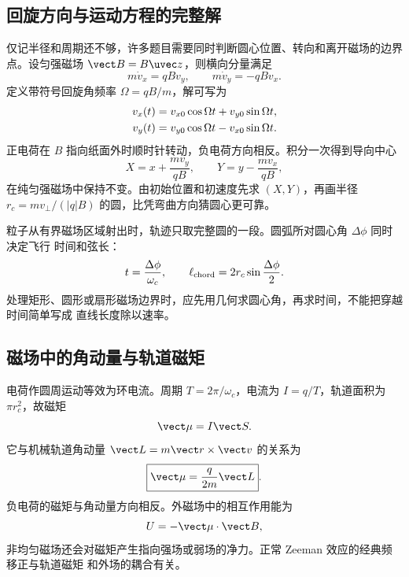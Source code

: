 \subsection*{回旋方向与运动方程的完整解}

仅记半径和周期还不够，许多题目需要同时判断圆心位置、转向和离开磁场的边界点。设匀强磁场
$\vect B=B\uvec z$，则横向分量满足
\begin{equation}
 m\dot v_x=qBv_y,
 \qquad
 m\dot v_y=-qBv_x.
\end{equation}
定义带符号回旋角频率 $\Omega=qB/m$，解可写为
\begin{align}
 v_x(t)&=v_{x0}\cos\Omega t+v_{y0}\sin\Omega t,\notag\\
 v_y(t)&=v_{y0}\cos\Omega t-v_{x0}\sin\Omega t.
\end{align}
正电荷在 $B$ 指向纸面外时顺时针转动，负电荷方向相反。积分一次得到导向中心
\begin{equation}
 X=x+\frac{mv_y}{qB},
 \qquad
 Y=y-\frac{mv_x}{qB},
\end{equation}
在纯匀强磁场中保持不变。由初始位置和初速度先求 $(X,Y)$，再画半径
$r_c=mv_\perp/(|q|B)$ 的圆，比凭弯曲方向猜圆心更可靠。

粒子从有界磁场区域射出时，轨迹只取完整圆的一段。圆弧所对圆心角 $\Delta\phi$ 同时决定飞行
时间和弦长：
\begin{equation}
 t=\frac{\Delta\phi}{\omega_c},
 \qquad
 \ell_{\rm chord}=2r_c\sin\frac{\Delta\phi}{2}.
\end{equation}
处理矩形、圆形或扇形磁场边界时，应先用几何求圆心角，再求时间，不能把穿越时间简单写成
直线长度除以速率。

\subsection*{磁场中的角动量与轨道磁矩}

电荷作圆周运动等效为环电流。周期 $T=2\pi/\omega_c$，电流为 $I=q/T$，轨道面积为
$\pi r_c^2$，故磁矩
\begin{equation}
 \vect\mu=I\vect S.
\end{equation}
它与机械轨道角动量 $\vect L=m\vect r\times\vect v$ 的关系为
\begin{equation}
 \boxed{\vect\mu=\frac q{2m}\vect L}.
\end{equation}
负电荷的磁矩与角动量方向相反。外磁场中的相互作用能为
\begin{equation}
 U=-\vect\mu\cdot\vect B,
\end{equation}
非均匀磁场还会对磁矩产生指向强场或弱场的净力。正常 Zeeman 效应的经典频移正与轨道磁矩
和外场的耦合有关。

